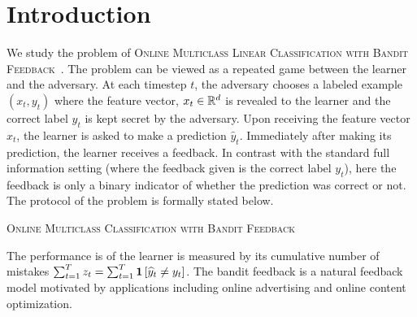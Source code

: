 \section{Introduction}
\label{section:introduction}

We study the problem of \textsc{Online Multiclass Linear Classification with
Bandit Feedback}~\citep{Kakade-Shalev-Shwartz-Tewari-2008}. The problem can be
viewed as a repeated game between the learner and the adversary. At each timestep $t$,
the adversary chooses a labeled example $(x_t, y_t)$ where the feature vector, $x_t \in
\mathbb{R}^d$ is revealed to the learner and the correct label $y_t$ is kept secret by
the adversary. Upon receiving the feature vector $x_t$, the learner is asked to
make a prediction $\widehat{y}_t$. Immediately after making its prediction, the
learner receives a feedback. In contrast with the standard full information
setting (where the feedback given is the correct label $y_t$), here the feedback
is only a binary indicator of whether the prediction was correct or not. The
protocol of the problem is formally stated below.

\begin{algorithm}[h]
\caption{\textsc{Online Multiclass Classification with Bandit Feedback}
\label{algorithm:game-protocol}}
\begin{algorithmic}[1]
{
\ENDFOR
}
\end{algorithmic}
\end{algorithm}

The performance is of the learner is measured by its cumulative number of
mistakes $\sum_{t=1}^T z_t = \sum_{t=1}^T \mathbf{1}\left[\widehat y_t \neq y_t \right]$.
The bandit feedback is a natural feedback model motivated by applications
including online advertising and online content optimization.

